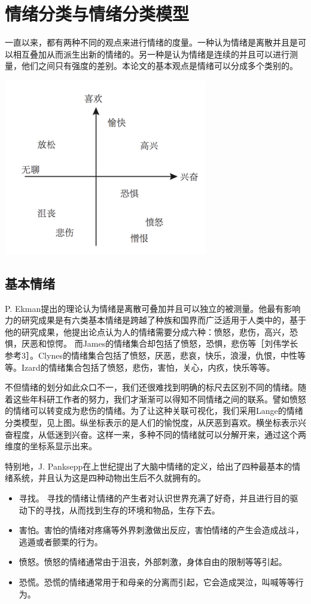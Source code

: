 \section{情绪分类与情绪分类模型}
	一直以来，都有两种不同的观点来进行情绪的度量。一种认为情绪是离散并且是可以相互叠加从而派生出新的情绪的。另一种是认为情绪是连续的并且可以进行测量，他们之间只有强度的差别。本论文的基本观点是情绪可以分成多个类别的。
	\centerline{\includegraphics[width=3.5in]{figure/emotion.png}}
	 \subsection{基本情绪}
	 P. Ekman提出的理论认为情绪是离散可叠加并且可以独立的被测量。他最有影响力的研究成果是有六类基本情绪是跨越了种族和国界而广泛适用于人类中的，基于他的研究成果，他提出论点认为人的情绪需要分成六种：愤怒，悲伤，高兴，恐惧，厌恶和惊愕。 而James的情绪集合却包括了愤怒，恐惧，悲伤等［刘伟学长参考3］。Clynes的情绪集合包括了愤怒，厌恶，悲哀，快乐，浪漫，仇恨，中性等等。Izard的情绪集合包括了愤怒，悲伤，害怕，关心，内疚，快乐等等。
	 
	 不但情绪的划分如此众口不一，我们还很难找到明确的标尺去区别不同的情绪。随着这些年科研工作者的努力，我们才渐渐可以得知不同情绪之间的联系。譬如愤怒的情绪可以转变成为悲伤的情绪。为了让这种关联可视化，我们采用Lange的情绪分类模型，见上图。纵坐标表示的是人们的愉悦度，从厌恶到喜欢。横坐标表示兴奋程度，从低迷到兴奋。这样一来，多种不同的情绪就可以分解开来，通过这个两维度的坐标系显示出来。
	 
	 特别地，J. Panksepp在上世纪提出了大脑中情绪的定义，给出了四种最基本的情绪系统，并且认为这是四种动物出生后不久就拥有的。
	 \begin{itemize}
	 	\item 寻找。 寻找的情绪让情绪的产生者对认识世界充满了好奇，并且进行目的驱动下的寻找，从而找到生存的环境和物品，生存下去。
		\item 害怕。害怕的情绪对疼痛等外界刺激做出反应，害怕情绪的产生会造成战斗，逃遁或者颤栗的行为。
		\item 愤怒。愤怒的情绪通常由于沮丧，外部刺激，身体自由的限制等等引起。
		\item 恐慌。恐慌的情绪通常用于和母亲的分离而引起，它会造成哭泣，叫喊等等行为。
	 \end{itemize}
